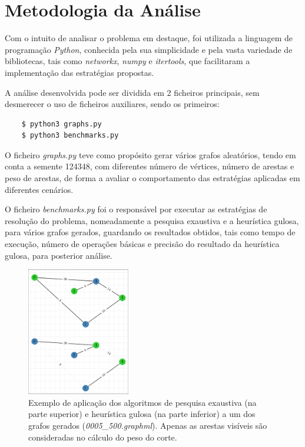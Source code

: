 \documentclass[mirror]{revdetua}
\begin{document}

\section{Metodologia da Análise}

Com o intuito de analisar o problema em destaque, foi utilizada a linguagem de programação \textit{Python}, conhecida pela sua simplicidade e pela vasta variedade de bibliotecas, tais como \textit{networkx}, \textit{numpy} e \textit{itertools}, que facilitaram a implementação das estratégias propostas.

A análise desenvolvida pode ser dividida em 2 ficheiros principais, sem desmerecer o uso de ficheiros auxiliares, sendo os primeiros:
\begin{verbatim}
    $ python3 graphs.py
    $ python3 benchmarks.py
\end{verbatim}

O ficheiro \textit{graphs.py} teve como propósito gerar vários grafos aleatórios, tendo em conta a semente 124348, com diferentes número de vértices, número de arestas e peso de arestas, de forma a avaliar o comportamento das estratégias aplicadas em diferentes cenários.

O ficheiro \textit{benchmarks.py} foi o responsável por executar as estratégias de resolução do problema, nomeadamente a pesquisa exaustiva e a heurística gulosa, para vários grafos gerados, guardando os resultados obtidos, tais como tempo de execução, número de operações básicas e precisão do resultado da heurística gulosa, para posterior análise.

\begin{figure}[h]
    \centering
    \includegraphics[width=0.4\textwidth]{../assets/exampGraph.png}
    \caption{Exemplo de aplicação dos algoritmos de pesquisa exaustiva (na parte superior) e heurística gulosa (na parte inferior) a um dos grafos gerados (\textit{0005\_500.graphml}). Apenas as arestas visíveis são consideradas no cálculo do peso do corte.}  
    \label{fig:exmpgraph2}
\end{figure}
\end{document}
